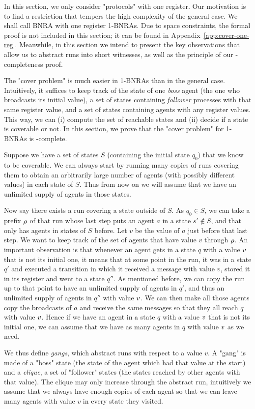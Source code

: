 	In this section, we only consider "protocols" with one register. Our motivation is to find a restriction that tempers the high complexity of the general case. We shall call BNRA with one register 1-BNRAs. Due to space constraints, the formal proof is not included in this section; it can be found in Appendix~\ref{app:cover-one-reg}. Meanwhile, in this section we intend to present the key observations that allow us to abstract runs into short witnesses, as well as the principle of our \NP-completeness proof.
	
	The "cover problem" is much easier in 1-BNRAs than in the general case. Intuitively, it suffices to keep track of the state of one \emph{boss} agent (the one who broadcasts its initial value), a set of states containing \emph{follower} processes with that same register value, and a set of states containing agents with any register values. This way, we can (i) compute the set of reachable states and (ii) decide if a state is coverable or not. In this section, we prove that the "cover problem" for 1-BNRAs is \NP-complete.

	Suppose we have a set of states $S$ (containing the initial state $q_0$) that we know to be coverable. We can always start by running many copies of runs covering them to obtain an arbitrarily large number of agents (with possibly different values) in each state of $S$. Thus from now on we will assume that we have an unlimited supply of agents in those states.

	Now say there exists a run covering a state outside of $S$. As $q_0 \in S$, we can take a prefix $\rho$ of that run whose last step puts an agent $a$ in a state $s' \notin S$, and that only has agents in states of $S$ before. 
	Let $v$ be the value of $a$ just before that last step.
	We want to keep track of the set of agents that have value $v$ through $\rho$.
	An important observation is that whenever an agent gets in a state $q$ with a value $v$ that is not its initial one, it means that at some point in the run, it was in a state $q'$ and executed a transition in which it received a message with value $v$, stored it in its register and went to a state $q''$. 
	As mentioned before, we can copy the run up to that point to have an unlimited supply of agents in $q'$, and thus an unlimited supply of agents in $q''$ with value $v$. We can then make all those agents copy the broadcasts of $a$ and receive the same messages so that they all reach $q$ with value $v$. Hence if we have an agent in a state $q$ with a value $v$ that is not its initial one, we can assume that we have as many agents in $q$ with value $v$ as we need.	
	
	We thus define \emph{gangs}, which abstract runs with respect to a value $v$. A "gang" is made of a "boss" state (the state of the agent which had that value at the start) and a \emph{clique}, a set of "follower" states (the states reached by other agents with that value). The clique may only increase through the abstract run, intuitively we assume that we always have enough copies of each agent so that we can leave many agents with value $v$ in every state they visited.

	
		



